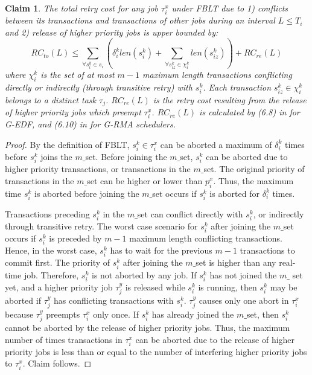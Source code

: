 \documentclass[a4paper,english]{article}
\newtheorem{clm}{Claim}
\newtheorem{proof}{Proof}
\begin{document}
\begin{clm}
The total retry cost for any job $\tau_{i}^{x}$ under FBLT due to 1) conflicts
between its transactions and transactions of other jobs during an interval $L\le T_{i}$ and 2) release of higher priority jobs is upper bounded by:
%
\begin{equation}
RC_{to}(L)\le\sum_{\forall s_{i}^{k}\in s_{i}}\left(\delta_{i}^{k}len(s_{i}^{k})+\sum_{\forall s_{iz}^k\in \chi_i^k} len(s_{iz}^{k})\right)+RC_{re}(L)\label{eq:fblt_rc}
\end{equation} 
where $\chi_i^k$ is the set of at most $m-1$ maximum length transactions conflicting directly or indirectly (through transitive retry) with $s_i^k$. Each transaction $s_{iz}^k \in \chi_i^k$ belongs to a distinct task $\tau_j$. $RC_{re}(L)$ is the retry cost resulting
from the release of higher priority jobs which preempt $\tau_{i}^{x}$.
$RC_{re}(L)$ is calculated by (6.8) in \cite{shambake_phd_proposal}
for G-EDF, and (6.10) in \cite{shambake_phd_proposal} for G-RMA schedulers.
%
\end{clm}


\begin{proof}\normalfont
By the definition of FBLT, $s_{i}^{k}\in\tau_{i}^{x}$ can be aborted
a maximum of $\delta_{i}^{k}$ times before $s_{i}^{k}$ joins the $m\_$set. Before joining the $m\_$set, $s_{i}^{k}$ can be aborted due to higher priority transactions, or transactions
in the $m\_$set. The original priority of transactions in the $m\_$set can be higher or lower than
$p_{i}^{x}$. Thus, the maximum time $s_{i}^{k}$ is aborted before
joining the $m\_$set occurs if $s_{i}^{k}$ is aborted for $\delta_{i}^{k}$ times. 

Transactions preceding  $s_i^k$ in the $m\_$set can conflict directly with $s_i^k$, or indirectly through transitive retry. The worst case scenario for $s_{i}^{k}$ after joining the $m\_$set occurs if $s_{i}^{k}$ is preceded by $m-1$ maximum length conflicting transactions. Hence, in the worst case, $s_{i}^{k}$ has to wait for the previous $m-1$ transactions to commit first. The priority of $s_{i}^{k}$ after joining the $m\_$set is higher than any real-time job. Therefore, $s_{i}^{k}$ is not aborted
by any job. If $s_{i}^{k}$ has not joined the $m\_$ set yet, and a higher
priority job $\tau_{j}^{y}$ is released while $s_{i}^{k}$ is running,
then $s_{i}^{k}$ may be aborted if $\tau_{j}^{y}$ has conflicting
transactions with $s_{i}^{k}$. $\tau_{j}^{y}$ causes only one abort
in $\tau_{i}^{x}$ because $\tau_{j}^{y}$ preempts $\tau_{i}^{x}$
only once. If $s_{i}^{k}$ has already joined the $m\_$set, then $s_{i}^{k}$
cannot be aborted by the release of higher priority jobs. Thus, the maximum
number of times transactions in $\tau_{i}^{x}$ can be aborted due to the release
of higher priority jobs is less than or equal to the number of interfering
higher priority jobs to $\tau_{i}^{x}$. Claim follows.
\end{proof}
\end{document}
